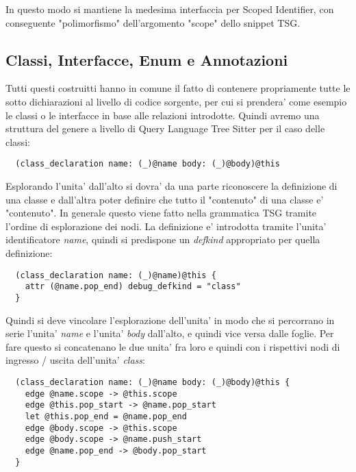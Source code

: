 
In questo modo si mantiene la medesima interfaccia per Scoped Identifier, con conseguente "polimorfismo" dell'argomento "scope" dello snippet TSG.

\subsection{Classi, Interfacce, Enum e Annotazioni}

Tutti questi costruitti hanno in comune il fatto di contenere propriamente tutte le sotto dichiarazioni al livello di codice sorgente, per cui si prendera' come esempio le classi o le interfacce in base alle relazioni introdotte.
Quindi avremo una struttura del genere a livello di Query Language Tree Sitter per il caso delle classi:

\begin{lstlisting}
  (class_declaration name: (_)@name body: (_)@body)@this
\end{lstlisting}

Esplorando l'unita' dall'alto si dovra' da una parte riconoscere la definizione di una classe e dall'altra poter definire che tutto il "contenuto" di una classe e' "contenuto".
In generale questo viene fatto nella grammatica TSG tramite l'ordine di esplorazione dei nodi.
La definizione e' introdotta tramite l'unita' identificatore \emph{name}, quindi si predispone un \emph{defkind} appropriato per quella definizione:

\begin{lstlisting}
  (class_declaration name: (_)@name)@this {
    attr (@name.pop_end) debug_defkind = "class"
  }
\end{lstlisting}

Quindi si deve vincolare l'esplorazione dell'unita' in modo che si percorrano in serie l'unita' \emph{name} e l'unita' \emph{body} dall'alto, e quindi vice versa dalle foglie.
Per fare questo si concatenano le due unita' fra loro e quindi con i rispettivi nodi di ingresso / uscita dell'unita' \emph{class}: 

\begin{lstlisting}
  (class_declaration name: (_)@name body: (_)@body)@this {
    edge @name.scope -> @this.scope
    edge @this.pop_start -> @name.pop_start
    let @this.pop_end = @name.pop_end
    edge @body.scope -> @this.scope
    edge @body.scope -> @name.push_start
    edge @name.pop_end -> @body.pop_start
  }
\end{lstlisting}


